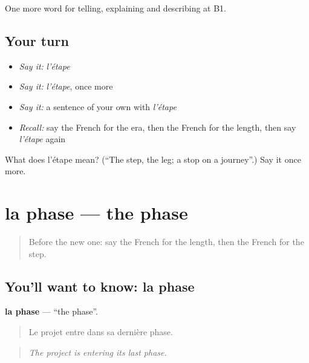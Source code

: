 \begin{grammarlens}[title={What you've built}]
One more word for telling, explaining and describing at B1.
\end{grammarlens}

\subsection*{Your turn}
\begin{itemize}
\raggedright
  \item \emph{Say it:} \emph{l'étape}
  \item \emph{Say it:} \emph{l'étape}, once more
  \item \emph{Say it:} a sentence of your own with \emph{l'étape}
  \item \emph{Recall:} say the French for the era, then the French for the length, then say \emph{l'étape} again
\end{itemize}

\begin{tcolorbox}[breakable,colback=teal!4,colframe=teal!35!black,title={Before you move on}]
What does l'étape mean? (\textquotedblleft{}The step, the leg; a stop on a journey\textquotedblright{}.) Say it once more.
\end{tcolorbox}
\section[la phase]{la phase — the phase}

\label{lesson:FR-C277-phase}



\begin{quote}
Before the new one: say the French for the length, then the French for the step.
\end{quote}

\subsection*{You'll want to know: la phase}
\textbf{la phase} — \textquotedblleft{}the phase\textquotedblright{}.

\begin{quote}
Le projet entre dans sa dernière phase.
\end{quote}

\begin{quote}
\emph{The project is entering its last phase.}
\end{quote}

